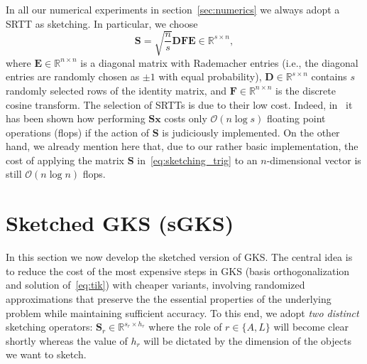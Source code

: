 \documentclass[%
  a4paper,
  onecolumn,
  colorlinks,
]{preprint}
\theoremstyle{plain}
\theoremstyle{definition}
\newcommand{\bD}{\ensuremath{\boldsymbol{D}}}
\newcommand{\bE}{\ensuremath{\boldsymbol{E}}}
\newcommand{\bF}{\ensuremath{\boldsymbol{F}}}
\newcommand{\bS}{\ensuremath{\boldsymbol{S}}}
\newcommand{\bx}{\mathbf{x}}
\begin{document}
In all our numerical experiments in section~\ref{sec:numerics} we always adopt a SRTT as sketching. In particular, we choose
\begin{equation}\label{eq:sketching_trig}
\bS=  \sqrt{\frac{n}{s}}\bD\bF\bE\in\mathbb{R}^{s\times n},
\end{equation}
where $\bE\in\mathbb{R}^{n\times n}$ is a diagonal matrix with Rademacher entries
(i.e., the diagonal entries are randomly chosen as $\pm 1$ with equal
probability), $\bD\in\mathbb{R}^{s\times n}$
 contains $s$ randomly selected rows of
the identity matrix, and $\bF\in\mathbb{R}^{n\times n}$ is the discrete cosine transform.
The selection of SRTTs is due to their low cost. Indeed, in~\cite{WOOLFEetal2008} it has been shown how
 performing $\bS \bx$ costs only $\mathcal{O}(n\log s)$
 floating point operations (flops) if the action of $\bS$ is
judiciously implemented. On the other hand, we already mention here that, due to our rather basic implementation, the cost of applying the matrix $\bS$ in~\eqref{eq:sketching_trig} to an $n$-dimensional vector is still  $\mathcal O(n \log n)$ flops.


\section{Sketched GKS (sGKS)}\label{sec:sketching_GKS}

In this section we now develop the sketched version of GKS.
The central idea is to reduce the cost of the most expensive steps in GKS (basis orthogonalization and solution of~\eqref{eq:tik})
with cheaper variants, involving
randomized approximations that preserve the the essential properties of the underlying problem while maintaining sufficient accuracy.
To this end, we adopt \emph{two distinct} sketching operators: $\bS_r \in\mathbb{R}^{s_r\times h_r}$ where the role of $r\in\{A,L\}$ will become clear shortly whereas the value of $h_r$ will be dictated by the dimension of the objects we want to sketch.
\end{document}
